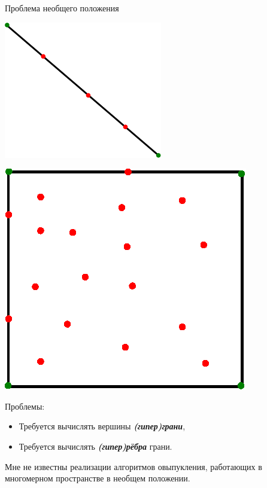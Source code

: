 \documentclass[]{beamer} %
\begin{document}
\begin{frame}{Проблема необщего положения}
     \begin{minipage}{.49\textwidth}
     \centering
     \includegraphics[width=0.8\linewidth]{line2.pdf}
   \end{minipage}
   \begin{minipage}{.49\textwidth}
     \centering
     \includegraphics[width=0.8\linewidth]{cube12.eps}
   \end{minipage}

   \bigskip

   Проблемы:
   \begin{itemize}
    \item  Требуется вычислять вершины \textbf{\textit{(гипер)грани}},
    \item  Требуется вычислять \textbf{\textit{(гипер)рёбра}} грани.
    \end{itemize}
   \vfill
   Мне не известны реализации алгоритмов овыпукления, работающих в многомерном пространстве в необщем положении.
 \end{frame}
\end{document}
